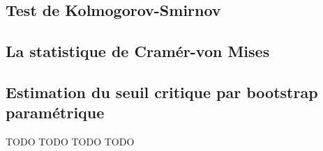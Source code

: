 \subsection{Test de Kolmogorov-Smirnov}

\subsection{La statistique de Cramér-von Mises}

\subsection{Estimation du seuil critique par bootstrap paramétrique}





TODO   TODO   TODO   TODO



